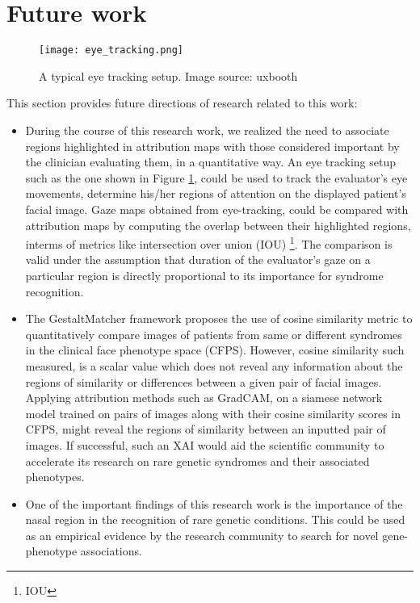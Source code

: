 \documentclass[../report.tex]{subfiles}
\begin{document}
    \section{Future work}
    \begin{figure}[H]
    	\centering     
    	\texttt{[image: eye\_tracking.png]}
    	\caption{A typical eye tracking setup. Image source: uxbooth\protect\footnotemark}
    	\label{fig_eye_track}
    \end{figure}
    This section provides future directions of research related to this work:
    \begin{itemize}
    	\item  During the course of this research work, we realized the need to associate regions highlighted in attribution maps with those considered important by the clinician evaluating them, in a quantitative way. An eye tracking setup such as the one shown in Figure \ref{fig_eye_track}, could be used to track the evaluator's eye movements, determine his/her regions of attention on the displayed patient's facial image. Gaze maps obtained from eye-tracking, could be compared with attribution maps by computing the overlap between their highlighted regions, interms of metrics like intersection over union (IOU) \footnote[2]{IOU}. The comparison is valid under the assumption that duration of the evaluator's gaze on a particular region is directly proportional to its importance for syndrome recognition. 
    	\item The GestaltMatcher framework proposes the use of cosine similarity metric to quantitatively compare images of patients from same or different syndromes in the clinical face phenotype space (CFPS). However, cosine similarity such measured, is a scalar value which does not reveal any information about the regions of similarity or differences between a given pair of facial images. Applying attribution methods such as GradCAM, on a siamese network \cite{taigman2014deepface} model trained on pairs of images along with their cosine similarity scores  in CFPS, might reveal the regions of similarity between an inputted pair of images. If successful, such an XAI would aid the scientific community to accelerate its research on rare genetic syndromes and their associated phenotypes.
    	\item  One of the important findings of this research work is the importance of the nasal region in the recognition of rare genetic conditions. This could be used as an empirical evidence by the research community to search for novel gene-phenotype associations.
    
    \end{itemize}
\end{document}
